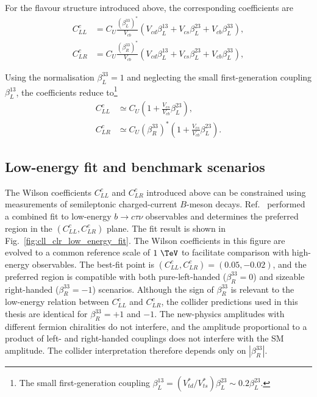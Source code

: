 For the flavour structure introduced above, the corresponding coefficients
are
\begin{align}
    C_{LL}^{c}
    &=
    C_{U}
    \frac{
        \left(\beta_{L}^{33}\right)^{*}
    }{
        V_{cb}
    }
    \left(
        V_{cd}\beta_{L}^{13}
        +
        V_{cs}\beta_{L}^{23}
        +
        V_{cb}\beta_{L}^{33}
    \right),
    \label{eq:cll_c}
    \\
    C_{LR}^{c}
    &=
    C_{U}
    \frac{
        \left(\beta_{R}^{33}\right)^{*}
    }{
        V_{cb}
    }
    \left(
        V_{cd}\beta_{L}^{13}
        +
        V_{cs}\beta_{L}^{23}
        +
        V_{cb}\beta_{L}^{33}
    \right),
    \label{eq:clr_c}
\end{align}

Using the normalisation $\beta_{L}^{33}=1$ and neglecting the small
first-generation coupling $\beta_{L}^{13}$, the coefficients reduce to\footnote{The small first-generation coupling $\beta_L^{13}=(V_{td}^{*}/V_{ts}^{*})\beta_L^{23}\sim0.2\beta_L^{23}$.}
\begin{align}
    C_{LL}^{c}
    &\simeq
    C_{U}
    \left(
        1+
        \frac{V_{cs}}{V_{cb}}\beta_{L}^{23}
    \right),
    \label{eq:cll_c_approx}
    \\
    C_{LR}^{c}
    &\simeq
    C_{U}
    \left(\beta_{R}^{33}\right)^{*}
    \left(
        1+
        \frac{V_{cs}}{V_{cb}}\beta_{L}^{23}
    \right).
    \label{eq:clr_c_approx}
\end{align}

\subsection{Low-energy fit and benchmark scenarios}
\label{subsec:u1_low_energy_fit}

The Wilson coefficients $C_{LL}^{c}$ and $C_{LR}^{c}$ introduced above can be constrained using measurements of semileptonic charged-current $B$-meson decays. Ref.~\cite{Aebischer2022} performed a combined fit to low-energy $b\rightarrow c\tau\nu$ observables and determines the preferred region in the $(C_{LL}^{c},C_{LR}^{c})$ plane. The fit result is shown in Fig.~\ref{fig:cll_clr_low_energy_fit}. The Wilson coefficients in this figure are evolved to a common reference scale of $1~\TeV$ to facilitate comparison with high-energy observables. The best-fit point is $(C_{LL}^{c}, C_{LR}^{c})=(0.05,-0.02)$, and the preferred region is compatible with both pure-left-handed ($\beta_{R}^{33}=0$) and sizeable right-handed ($\beta_{R}^{33}=-1$) scenarios.
Although the sign of $\beta_R^{33}$ is relevant to the low-energy relation between $C_{LL}^{c}$ and $C_{LR}^{c}$, the collider predictions used in this thesis are identical for $\beta_R^{33}=+1$ and $-1$. The new-physics amplitudes with different fermion chiralities do not interfere, and the amplitude proportional to a product of left- and right-handed couplings does not interfere with the SM amplitude. The collider interpretation therefore depends only on $|\beta_R^{33}|$.

